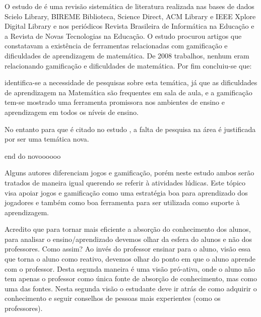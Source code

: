 O estudo de \cite{revbibmatgam} é uma revisão sistemática de literatura realizada nas bases de dados Scielo Library, BIREME Biblioteca, Science Direct, ACM Library e IEEE Xplore Digital Library e nos periódicos Revista Brasileira de Informática na Educação e a Revista de Novas Tecnologias na Educação. O estudo procurou artigos que constatavam a existência de ferramentas relacionadas com gamificação e dificuldades de aprendizagem de matemática. De 2008 trabalhos, nenhum eram relacionando gamificação e dificuldades de matemática. Por fim concluiu-se que:

\begin{citacao}
identifica-se a necessidade de pesquisas sobre esta temática, já que as dificuldades de aprendizagem na Matemática são frequentes em sala de aula, e a gamificação tem-se mostrado uma ferramenta promissora nos ambientes de ensino e aprendizagem em todos os níveis de ensino. 
\end{citacao}

No entanto para \cite{dicheva} que é citado no estudo \cite{revbibmatgam}, a falta de pesquisa na área é justificada por ser uma temática nova.


end do novoooooo















Alguns autores diferenciam jogos e gamificação, porém neste estudo ambos serão tratados de maneira igual querendo se referir à atividades lúdicas. Este tópico visa apoiar jogos e gamificação como uma estratégia boa para aprendizado dos jogadores e também como boa ferramenta para ser utilizada como suporte à aprendizagem.  

Acredito que para tornar mais eficiente a absorção do conhecimento dos alunos, para analisar o ensino/aprendizado devemos olhar da esfera do alunos e não dos professores. Como assim? Ao invés do professor ensinar para o aluno, visão essa que torna o aluno como reativo, devemos olhar do ponto em que o aluno aprende com o professor. Desta segunda maneira é uma visão pró-ativa, onde o aluno não tem apenas o professor como única fonte de absorção de conhecimento, mas como uma das fontes. Nesta segunda visão o estudante deve ir atrás de como adquirir o conhecimento e seguir conselhos de pessoas mais experientes (como os professores). 

